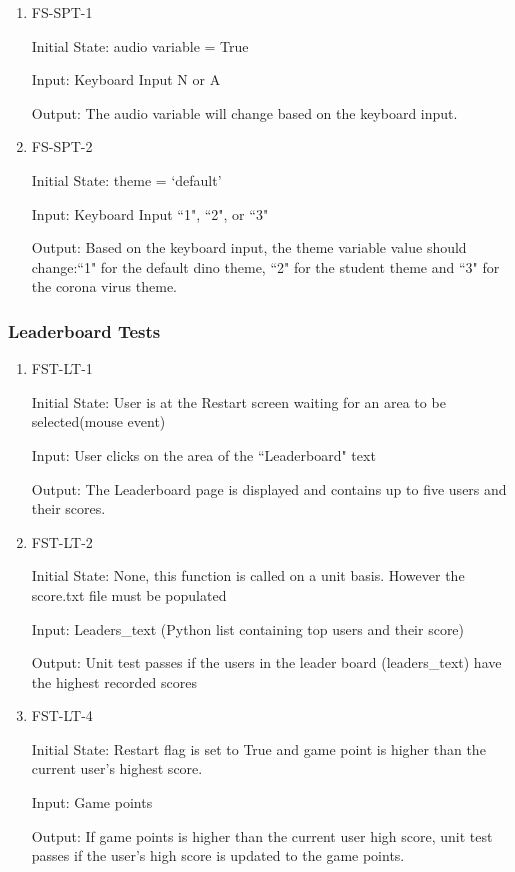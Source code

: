 \documentclass[12pt, titlepage]{article}
\begin{document}
\begin{enumerate}

\item{FS-SPT-1\\}

Initial State: audio variable = True
					
Input: Keyboard Input N or A 
					
Output: The audio variable will change based on the keyboard input. 


\item{FS-SPT-2\\}


Initial State: theme = `default'
					
Input: Keyboard Input ``1", ``2", or ``3"
					
Output: Based on the keyboard input, the theme variable value should change:``1" for the default dino theme, ``2" for the student theme and ``3" for the corona virus theme.
				
\end{enumerate}



\subsubsection{Leaderboard Tests}

\begin{enumerate}

\item{FST-LT-1\\}

Initial State: User is at the Restart screen waiting for an area to be selected(mouse event)
					
Input: User clicks on the area of the ``Leaderboard" text
					
Output: The Leaderboard page is displayed and contains up to five users and their scores.
					

\item{FST-LT-2\\}
					
Initial State: None, this function is called on a unit basis. However the score.txt file must be populated
					
Input: Leaders\_text (Python list containing top users and their score)
					
Output: Unit test passes if the users in the leader board (leaders\_text) have the highest recorded scores
					

\item{FST-LT-4\\}
					
Initial State: Restart flag is set to True and game point is higher than the current user's highest score.
					
Input: Game points
					
Output: If game points is higher than the current user high score, unit test passes if the user's high score is updated to the game points.
					

\end{enumerate}
\end{document}
